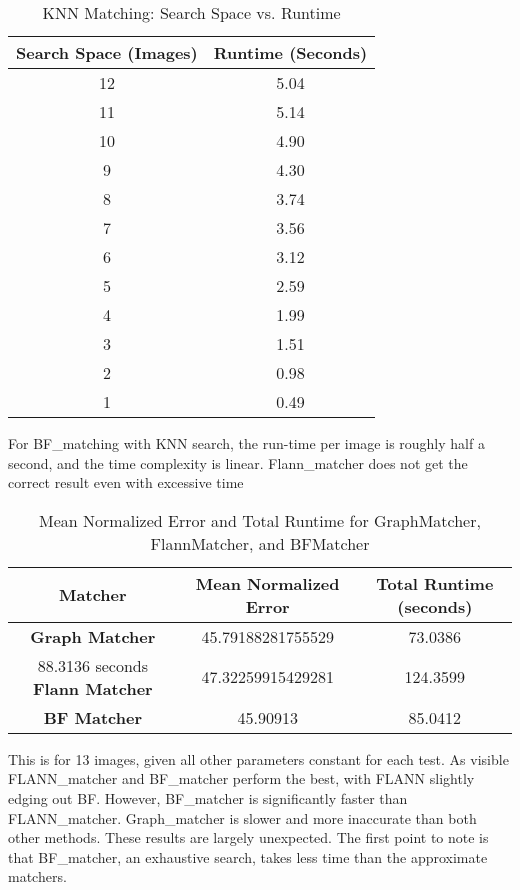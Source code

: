 \begin{table}[H]
    \centering
    \begin{tabular}{|c|c|}
    \hline
    \textbf{Search Space (Images)} & \textbf{Runtime (Seconds)} \\ \hline
    12  & 5.04 \\ \hline
    11  & 5.14 \\ \hline
    10  & 4.90 \\ \hline
    9   & 4.30 \\ \hline
    8   & 3.74 \\ \hline
    7   & 3.56 \\ \hline
    6   & 3.12 \\ \hline
    5   & 2.59 \\ \hline
    4   & 1.99 \\ \hline
    3   & 1.51 \\ \hline
    2   & 0.98 \\ \hline
    1   & 0.49 \\ \hline
    \end{tabular}
    \caption{KNN Matching: Search Space vs. Runtime}
    \end{table}

For BF\_matching with KNN search, the run-time per image is roughly half a second, and the time complexity is linear.   
Flann\_matcher does not get the correct result even with excessive time


\begin{table}[H]
    \centering
    \begin{tabular}{|c|c|c|}
    \hline
    \textbf{Matcher} & \textbf{Mean Normalized Error} & \textbf{Total Runtime (seconds)} \\ \hline
    \textbf{Graph Matcher} & 45.79188281755529 & 73.0386 \\ \hline 88.3136 seconds
    \textbf{Flann Matcher} & 47.32259915429281 & 124.3599 \\ \hline
    \textbf{BF Matcher} & 45.90913 & 85.0412 \\ \hline
    \end{tabular}
    \caption{Mean Normalized Error and Total Runtime for GraphMatcher, FlannMatcher, and BFMatcher}
\end{table}
    
    
    This is for 13 images, given all other parameters constant for each test. As visible FLANN\_matcher and BF\_matcher perform the best, with FLANN slightly edging out BF. However, BF\_matcher is significantly faster than FLANN\_matcher. Graph\_matcher is slower and more inaccurate than both other methods. 
    These results are largely unexpected. The first point to note is that BF\_matcher, an exhaustive search, takes less time than the approximate matchers. 

